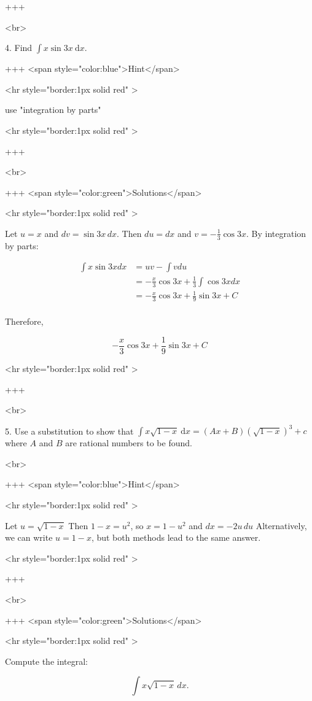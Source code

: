 +++

<br>

4. Find $\int x \sin 3 x \mathrm{~d} x$.

+++ <span style="color:blue">Hint</span>

<hr style="border:1px solid red" >

use "integration by parts"

<hr style="border:1px solid red" >

+++

<br>

+++ <span style="color:green">Solutions</span>

<hr style="border:1px solid red" >

Let $u=x$ and $dv=\sin 3x\,dx$. Then $du=dx$ and $v=-\tfrac{1}{3}\cos 3x$. By integration by parts:

$$
\begin{align}
\int x\sin 3x dx &= uv - \int v du\\
&= -\frac{x}{3}\cos 3x + \frac{1}{3}\int \cos 3x dx\\
&= -\frac{x}{3}\cos 3x + \frac{1}{9}\sin 3x + C\\
\end{align}
$$

Therefore,

$$
-\frac{x}{3}\cos 3x + \frac{1}{9}\sin 3x + C
$$

<hr style="border:1px solid red" >

+++

<br>


5. Use a substitution to show that $\int x \sqrt{1-x} \mathrm{~d} x=(A x+B)(\sqrt{1-x})^{3}+c$ where $A$ and $B$ are rational numbers to be found.

<br>

+++ <span style="color:blue">Hint</span>

<hr style="border:1px solid red" >

Let  $u=\sqrt{1-x}$ Then $1-x=u^{2}$, so $x=1-u^{2}$ and $dx=-2u\,du$
Alternatively, we can write $u=1-x$, but both methods lead to the same answer.

<hr style="border:1px solid red" >

+++

<br>

+++ <span style="color:green">Solutions</span>

<hr style="border:1px solid red" >

Compute the integral:

$$
\int x\sqrt{1-x}\,dx.
$$

